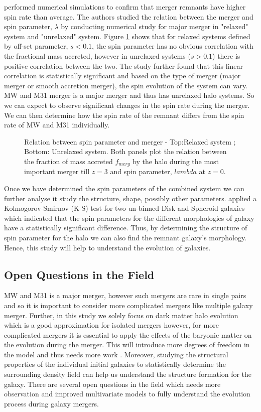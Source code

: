 \documentclass[twocolumn]{aastex631}
\begin{document}
\citet{D'Onghia2007} performed numerical simulations to confirm that merger remnants have higher spin rate than average. The authors studied the relation between the merger and spin parameter, $\lambda$ by conducting numerical study for major merger in "relaxed" system and "unrelaxed" system. Figure \ref{fig:spin_para} shows that for relaxed systems defined by off-set parameter, $s<0.1$, the spin parameter has no obvious correlation with the fractional mass accreted, however in unrelaxed systems ($s>0.1$) there is positive correlation between the two. The study further found that this linear correlation is statistically significant and based on the type of merger (major merger or smooth accretion merger), the spin evolution of the system can vary. MW and M31 merger is a major merger and thus has unrelaxed halo systems. So we can expect to observe significant changes in the spin rate during the merger. We can then determine how the spin rate of the remnant differs from the spin rate of MW and M31 individually.\\

\begin{figure}[H]
\caption{Relation between spin parameter and merger \citep{D'Onghia2007} - Top:Relaxed system ; Bottom: Unrelaxed system. Both panels plot the relation between the fraction of mass accreted $f_{merg}$ by the halo during the most important merger till $z=3$ and spin parameter, $lambda$ at $z=0$.
\label{fig:spin_para}}
\end{figure}

Once we have determined the spin parameters of the combined system we can further analyse it study the structure, shape, possibly other parameters. \citet{Teklu2015} applied a Kolmogorov-Smirnov (K-S) test for two un-binned Disk and Spheroid galaxies which indicated that the spin parameters for the different morphologies of galaxy have a statistically significant difference. Thus, by determining the structure of spin parameter for the halo we can also find the remnant galaxy's morphology. Hence, this study will help to understand the evolution of galaxies.
\subsection{Open Questions in the Field}
MW and M31 is a major merger, however such mergers are rare in single pairs and so it is important to consider more complicated mergers like multiple galaxy merger. Further, in this study we solely focus on dark matter halo evolution which is a good approximation for isolated mergers \citep{Kazantzidis2006} however, for more complicated mergers it is essential to apply the effects of the baryonic matter on the evolution during the merger. This will introduce more degrees of freedom in the model and thus needs more work \citep{Drakos2019a}. Moreover, studying the structural properties of the individual initial galaxies to statistically determine the surrounding density field can help us understand the structure formation for the galaxy. There are several open questions in the field which needs more observation and improved multivariate models to fully understand the evolution process during galaxy mergers.
\end{document}
